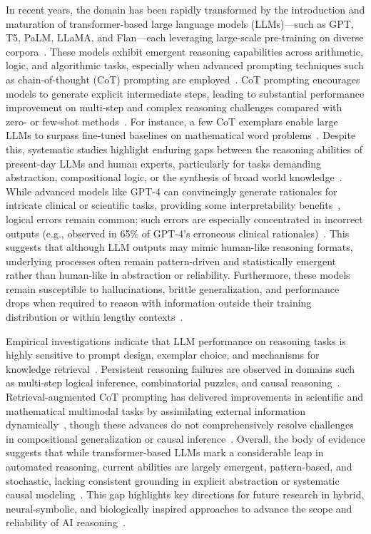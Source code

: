 \documentclass[sigconf]{acmart}
\begin{document}
In recent years, the domain has been rapidly transformed by the introduction and maturation of transformer-based large language models (LLMs)—such as GPT, T5, PaLM, LLaMA, and Flan—each leveraging large-scale pre-training on diverse corpora~\cite{ref1,ref5,ref10,ref11,ref18,ref19,ref42,ref43,ref44,ref70,ref86}. These models exhibit emergent reasoning capabilities across arithmetic, logic, and algorithmic tasks, especially when advanced prompting techniques such as chain-of-thought (CoT) prompting are employed~\cite{ref10,ref11,ref42}. CoT prompting encourages models to generate explicit intermediate steps, leading to substantial performance improvement on multi-step and complex reasoning challenges compared with zero- or few-shot methods~\cite{ref10,ref11,ref42}. For instance, a few CoT exemplars enable large LLMs to surpass fine-tuned baselines on mathematical word problems~\cite{ref11}. Despite this, systematic studies highlight enduring gaps between the reasoning abilities of present-day LLMs and human experts, particularly for tasks demanding abstraction, compositional logic, or the synthesis of broad world knowledge~\cite{ref19,ref43,ref44}. While advanced models like GPT-4 can convincingly generate rationales for intricate clinical or scientific tasks, providing some interpretability benefits~\cite{ref1}, logical errors remain common; such errors are especially concentrated in incorrect outputs (e.g., observed in 65\% of GPT-4's erroneous clinical rationales)~\cite{ref1}. This suggests that although LLM outputs may mimic human-like reasoning formats, underlying processes often remain pattern-driven and statistically emergent rather than human-like in abstraction or reliability. Furthermore, these models remain susceptible to hallucinations, brittle generalization, and performance drops when required to reason with information outside their training distribution or within lengthy contexts~\cite{ref1,ref18,ref42,ref43,ref44,ref70}.

Empirical investigations indicate that LLM performance on reasoning tasks is highly sensitive to prompt design, exemplar choice, and mechanisms for knowledge retrieval~\cite{ref1,ref5,ref10,ref19,ref11}. Persistent reasoning failures are observed in domains such as multi-step logical inference, combinatorial puzzles, and causal reasoning~\cite{ref1,ref10,ref19}. Retrieval-augmented CoT prompting has delivered improvements in scientific and mathematical multimodal tasks by assimilating external information dynamically~\cite{ref5,ref11,ref42}, though these advances do not comprehensively resolve challenges in compositional generalization or causal inference~\cite{ref43,ref44,ref70,ref86}. Overall, the body of evidence suggests that while transformer-based LLMs mark a considerable leap in automated reasoning, current abilities are largely emergent, pattern-based, and stochastic, lacking consistent grounding in explicit abstraction or systematic causal modeling~\cite{ref10,ref11,ref43,ref44}. This gap highlights key directions for future research in hybrid, neural-symbolic, and biologically inspired approaches to advance the scope and reliability of AI reasoning~\cite{ref42,ref49,ref86}.
\end{document}
